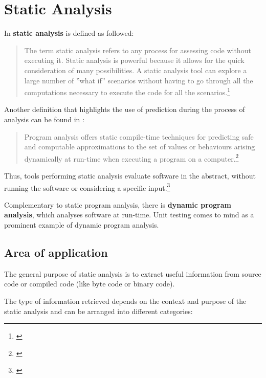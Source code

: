 \chapter{Static Analysis}
\label{chap:StaticAnalysis}

In  \textbf{static analysis} is defined as followed:

\begin{quotation}
The term static analysis refers to any process for assessing code without
executing it. Static analysis is powerful because it allows for the quick consideration of many possibilities. A static analysis tool can explore a large number of ''what if'' scenarios without having to go through all the computations
necessary to execute the code for all the scenarios.\footnote{\citep[3]{SecureProgramming}}
\end{quotation}

Another definition that highlights the use of prediction during the process of analysis can be found in :

\begin{quotation}
Program analysis offers static compile-time techniques for predicting safe and computable approximations to the set of values or behaviours arising dynamically at run-time when executing a program on a computer.\footnote{\citep[1]{ProgramAnalysis}}
\end{quotation}

Thus, tools performing static analysis evaluate software in the abstract, without running the software or considering a specific input.\footnote{\citep[1]{UsingSAToFindBugs}}

Complementary to static program analysis, there is \textbf{dynamic program analysis}, which analyses software at run-time. Unit testing comes to mind as a prominent example of dynamic program analysis.

\newpage
\section{Area of application}
\label{sec:AreaOfApplication}

The general purpose of static analysis is to extract useful information from source code or compiled code (like byte code or binary code).

The type of information retrieved depends on the context and purpose of the static analysis and can be arranged into different categories:

